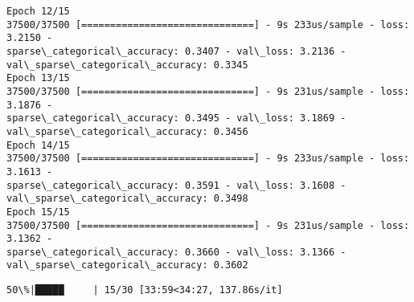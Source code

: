\documentclass[11pt]{article}
\begin{document}
\begin{Verbatim}[commandchars=\\\{\}]
Epoch 12/15
37500/37500 [==============================] - 9s 233us/sample - loss: 3.2150 -
sparse\_categorical\_accuracy: 0.3407 - val\_loss: 3.2136 -
val\_sparse\_categorical\_accuracy: 0.3345
Epoch 13/15
37500/37500 [==============================] - 9s 231us/sample - loss: 3.1876 -
sparse\_categorical\_accuracy: 0.3495 - val\_loss: 3.1869 -
val\_sparse\_categorical\_accuracy: 0.3456
Epoch 14/15
37500/37500 [==============================] - 9s 233us/sample - loss: 3.1613 -
sparse\_categorical\_accuracy: 0.3591 - val\_loss: 3.1608 -
val\_sparse\_categorical\_accuracy: 0.3498
Epoch 15/15
37500/37500 [==============================] - 9s 231us/sample - loss: 3.1362 -
sparse\_categorical\_accuracy: 0.3660 - val\_loss: 3.1366 -
val\_sparse\_categorical\_accuracy: 0.3602
    \end{Verbatim}

    \begin{Verbatim}[commandchars=\\\{\}]
 50\%|█████     | 15/30 [33:59<34:27, 137.86s/it]
    \end{Verbatim}
\end{document}

